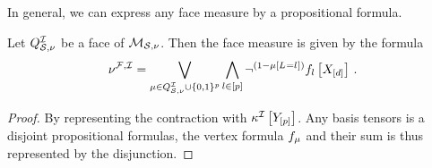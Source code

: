 


%

In general, we can express any face measure by a propositional formula.

\begin{theorem}
    \label{the:faceMeasureCharacterizationHLN}
    Let $Q^{\mathcal{I}}_{\mathcal{S},\nu}$ be a face of $\mathcal{M}_{\mathcal{S},\nu}$.
    Then the face measure is given by the formula
    \begin{align*}
        \nu^{\mathcal{F},\mathcal{I}}
        = \bigvee_{\mu\in Q^{\mathcal{I}}_{\mathcal{S},\nu}\cup\{0,1\}^{p}}
        \bigwedge_{l\in[p]} \lnot^{(1-\mu\left[L_{}=l_{}\right])} f_{l}\left[X_{[d]}\right] \, .
    \end{align*}
\end{theorem}
\begin{proof}
    By representing the contraction with $\kappa^{\mathcal{I}}\left[Y_{[p]}\right]$.
    Any basis tensors is a disjoint propositional formulas, the vertex formula $f_{\mu}$ and their sum is thus represented by the disjunction.
\end{proof}



